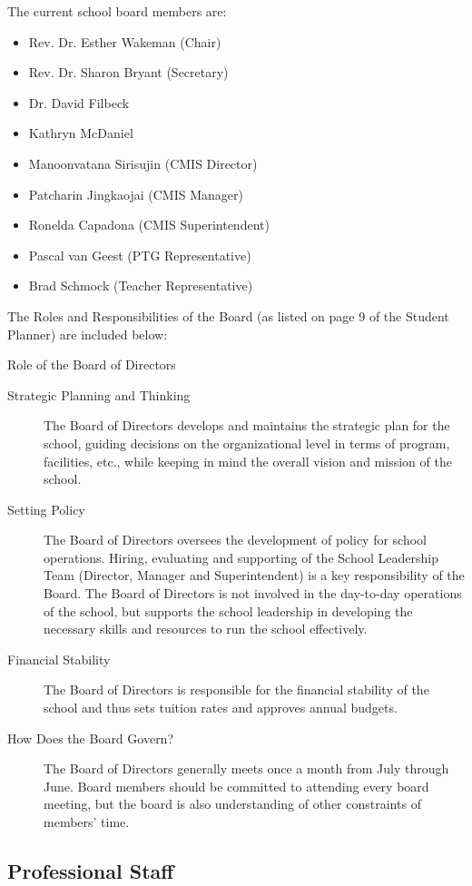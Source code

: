 The current school board members are: 

\begin{itemize}
\item Rev. Dr. Esther Wakeman (Chair)
\item Rev. Dr. Sharon Bryant (Secretary)
\item Dr. David Filbeck
\item Kathryn McDaniel
\item Manoonvatana Sirisujin (CMIS Director) 
\item Patcharin Jingkaojai (CMIS Manager) 
\item Ronelda Capadona (CMIS Superintendent) 
\item Pascal van Geest (PTG Representative)
\item Brad Schmock (Teacher Representative)
\end{itemize}


The Roles and Responsibilities of the Board (as listed on page 9 of the Student Planner) are included below:

Role of the Board of Directors
\begin{description}
\item [Strategic Planning and Thinking] The Board of Directors develops and maintains the strategic plan for the school, guiding decisions on the organizational level in terms of program, facilities, etc., while keeping in mind the overall vision and mission of the school.
\item [Setting Policy] The Board of Directors oversees the development of policy for school operations. Hiring, evaluating and supporting of the School Leadership Team (Director, Manager and Superintendent) is a key responsibility of the Board. The Board of Directors is not involved in the day-to-day operations of the school, but supports the school leadership in developing the necessary skills and resources to run the school effectively.
\item [Financial Stability] The Board of Directors is responsible for the financial stability of the school and thus sets tuition rates and approves annual budgets.
\item [How Does the Board Govern?] The Board of Directors generally meets once a month from July through June.  Board members should be committed to attending every board meeting, but the board is also understanding of other constraints of members’ time.
\end{description}

\subsection{Professional Staff}

